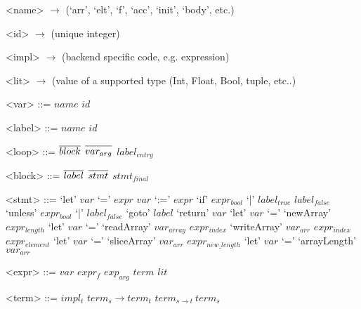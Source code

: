 \documentclass[preamble.tex]{subfiles}
\begin{document}

\setlength{\grammarindent}{5em} %
\renewcommand{\syntleft}{\normalfont\itshape} %
\renewcommand{\syntright}{}
\renewcommand{\litleft}{\ttfamily} %
\renewcommand{\litright}{}
\newcommand{\many}[1]{\overline{#1\vphantom{dummy}}} %


\setlength{\grammarparsep}{0pt} %

\begin{grammar}
<name> $\rightarrow$ (`arr', `elt', `f', `acc', `init', `body', etc.)

<id>   $\rightarrow$ (unique integer\footnotemark)

<impl> $\rightarrow$ (backend specific code, e.g.  expression)

<lit>  $\rightarrow$ (\Haskell value of a supported type (Int, Float, Bool, tuple, etc..)

<var>  ::= $name$ $id$

<label> ::= $name$ $id$

\end{grammar}

\setlength{\grammarparsep}{10pt plus 1pt minus 1pt} %
\begin{grammar}
<loop> ::= $\many{block}$ $\many{var_{arg}}$ $label_{entry}$

<block> ::= $\many{label}$ $\many{stmt}$ $stmt_{final}$

<stmt> ::= `let' $var$ `=' $expr$
      \alt $var$ `:=' $expr$
      \alt `if' $expr_{bool}$ `|' $label_{true}$ $label_{false}$
      \alt `unless' $expr_{bool}$ `|' $label_{false}$
      \alt `goto' $label$
      \alt `return' $var$
      \alt `let' $var$ `=' `newArray' $expr_{length}$
      \alt `let' $var$ `=' `readArray' $var_{array}$ $expr_{index}$
      \alt `writeArray' $var_{arr}$ $expr_{index}$ $expr_{element}$
      \alt `let' $var$ `=' `sliceArray' $var_{arr}$ $expr_{new\_length}$
      \alt `let' $var$ `=' `arrayLength' $var_{arr}$

<expr> ::= $var$
      \alt $expr_{\mathit{f}}$ $exp_{arg}$
      \alt $term$
      \alt $lit$

<term> ::= $impl_{t}$
      \alt $term_{s} \rightarrow term_{t}$
      \alt $term_{s \rightarrow t}\ term_{s}$

\end{grammar}
\end{document}
